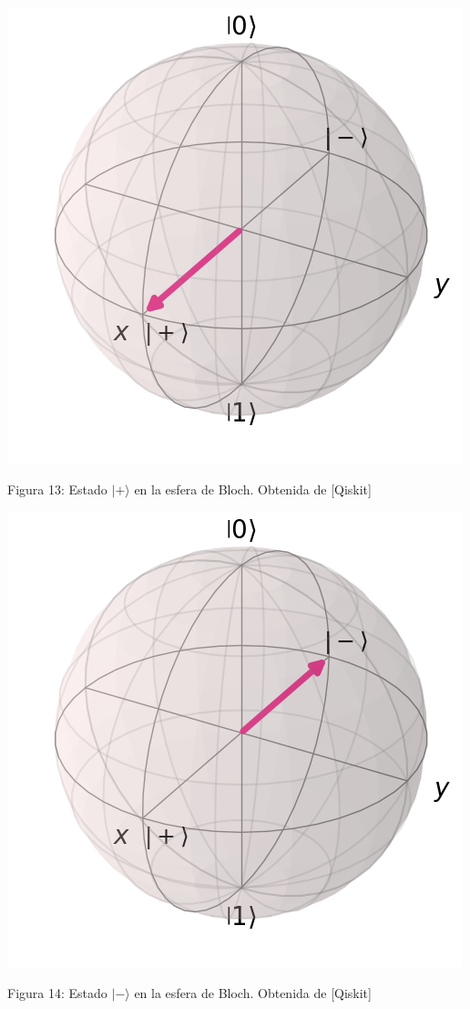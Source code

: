 \documentclass[12pt]{article}
\numberwithin{equation}{section} %
\begin{document}
    \begin{minipage}{0.1\textwidth}
        \hfill
    \end{minipage}
    \begin{minipage}{0.3\textwidth}
        \centering
        \includegraphics[width=\textwidth]{img/Bloch/bloch_state_+.png}
        \caption{Figura 13: Estado $|+\rangle$ en la esfera de Bloch. Obtenida de [Qiskit]}
    \end{minipage}
    \hfill
    \begin{minipage}{0.3\textwidth}
        \centering
        \includegraphics[width=\textwidth]{img/Bloch/bloch_state_-.png}
        \caption{Figura 14: Estado $|-\rangle$ en la esfera de Bloch. Obtenida de [Qiskit]}
    \end{minipage}
\end{document}
